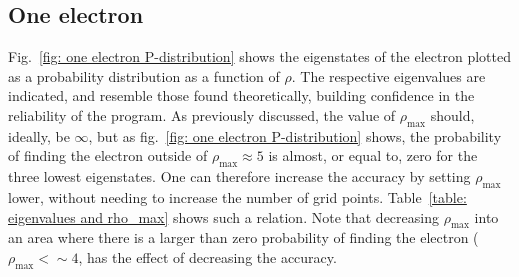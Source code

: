 \documentclass[11pt, a4paper]{article}
\begin{document}
		\subsection{One electron}
			Fig.~\ref{fig: one electron P-distribution} shows the eigenstates of the electron plotted as a probability distribution as a function of $\rho$. The respective eigenvalues are indicated, and resemble those found theoretically, building confidence in the reliability of the program. As previously discussed, the value of $\rho_\mathrm{max}$ should, ideally, be $\infty$, but as fig.~\ref{fig: one electron P-distribution} shows, the probability of finding the electron outside of $\rho_\mathrm{max}\approx 5$ is almost, or equal to, zero for the three lowest eigenstates. One can therefore increase the accuracy by setting $\rho_\mathrm{max}$ lower, without needing to increase the number of grid points. Table~\ref{table: eigenvalues and rho_max} shows such a relation. Note that decreasing $\rho_\mathrm{max}$ into an area where there is a larger than zero probability of finding the electron ($\rho_\mathrm{max}<\sim 4$, has the effect of decreasing the accuracy. 
			
\end{document}
